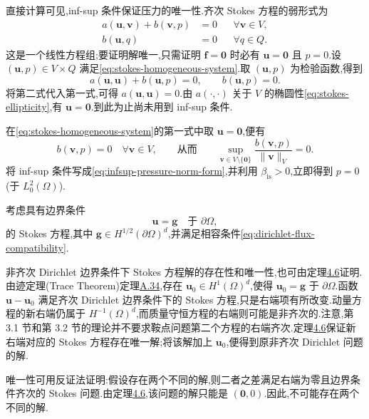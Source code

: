\begin{note}\label{note:stokes-pressure-uniqueness}
直接计算可见,inf-sup 条件保证压力的唯一性.齐次 Stokes 方程的弱形式为
\begin{equation}\label{eq:stokes-homogeneous-system}
\begin{aligned}
  a(\bm{u},\bm{v})+b(\bm{v},p)&=0
       &&\forall\bm{v}\in V,\\
  b(\bm{u},q)&=0
       &&\forall q\in Q.
\end{aligned}
\end{equation}
这是一个线性方程组;要证明解唯一,只需证明 $\bm{f}=\bm{0}$ 时必有 $\bm{u}=\bm{0}$ 且 $p=0$.设 $(\bm{u},p)\in V\times Q$ 满足\cref{eq:stokes-homogeneous-system}.取 $(\bm{u},p)$ 为检验函数,得到
\[
  a(\bm{u},\bm{u})+b(\bm{u},p)=0,
  \qquad b(\bm{u},p)=0.
\]
将第二式代入第一式,可得 $a(\bm{u},\bm{u})=0$.由 $a(\cdot,\cdot)$ 关于 $V$ 的椭圆性\cref{eq:stokes-ellipticity},有 $\bm{u}=\bm{0}$.到此为止尚未用到 inf-sup 条件.

在\cref{eq:stokes-homogeneous-system}的第一式中取 $\bm{u}=\bm{0}$,便有
\[
  b(\bm{v},p)=0\quad\forall\bm{v}\in V,
  \qquad\text{从而}\qquad
  \sup_{\bm{v}\in V\setminus\{\bm{0}\}}
       \frac{b(\bm{v},p)}{\|\bm{v}\|_V}=0.
\]
将 inf-sup 条件写成\cref{eq:infsup-pressure-norm-form},并利用 $\beta_{\mathrm{is}}>0$,立即得到 $p=0$(于 $L_0^2(\Omega)$).
\end{note}

\begin{note}\label{note:stokes-nonhomogeneous-dirichlet}
考虑具有边界条件
\[
  \bm{u}=\bm{g}\quad\text{于 }\partial\Omega,
\]
的 Stokes 方程,其中 $\bm{g}\in H^{1/2}(\partial\Omega)^d$,并满足相容条件\cref{eq:dirichlet-flux-compatibility}.

非齐次 Dirichlet 边界条件下 Stokes 方程解的存在性和唯一性,也可由定理\hyperref[thm:stokes-4-6]{4.6}证明.由迹定理(Trace Theorem)定理\hyperref[thm:appendix-a-34]{A.34},存在 $\bm{u}_0\in H^1(\Omega)^d$,使得 $\bm{u}_0=\bm{g}$ 于 $\partial\Omega$.函数 $\bm{u}-\bm{u}_0$ 满足齐次 Dirichlet 边界条件下的 Stokes 方程,只是右端项有所改变.动量方程的新右端仍属于 $H^{-1}(\Omega)^d$,而质量守恒方程的右端则可能是非齐次的.注意,第 3.1 节和第 3.2 节的理论并不要求鞍点问题第二个方程的右端齐次.定理\hyperref[thm:stokes-4-6]{4.6}保证新右端对应的 Stokes 方程存在唯一解;将该解加上 $\bm{u}_0$,便得到原非齐次 Dirichlet 问题的解.

唯一性可用反证法证明:假设存在两个不同的解,则二者之差满足右端为零且边界条件齐次的 Stokes 问题.由定理\hyperref[thm:stokes-4-6]{4.6},该问题的解只能是 $(\bm{0},0)$.因此,不可能存在两个不同的解.
\end{note}

